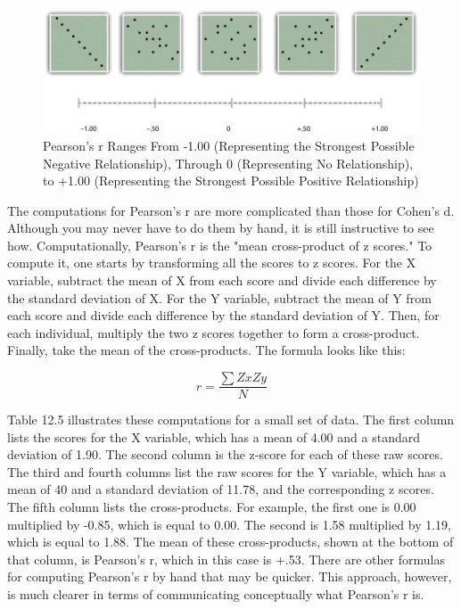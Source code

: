 \begin{figure}
\includegraphics[width=\linewidth]{figures/Fig12-9}
\caption{ Pearson's r Ranges From -1.00 (Representing the Strongest Possible Negative Relationship), Through 0 (Representing No Relationship), to +1.00 (Representing the Strongest Possible Positive Relationship)}
\label{fig:pearsons}
\end{figure}


The computations for Pearson's r are more complicated than those for Cohen's d. Although you may never have to do them by hand, it is still instructive to see how. Computationally, Pearson's r is the "mean cross-product of z scores." To compute it, one starts by transforming all the scores to z scores. For the X variable, subtract the mean of X from each score and divide each difference by the standard deviation of X. For the Y variable, subtract the mean of Y from each score and divide each difference by the standard deviation of Y. Then, for each individual, multiply the two z scores together to form a cross-product. Finally, take the mean of the cross-products. The formula looks like this:

\begin{equation}
r = \frac{\sum ZxZy}{N} 
\end{equation}

Table 12.5 illustrates these computations for a small set of data. The first column lists the scores for the X variable, which has a mean of 4.00 and a standard deviation of 1.90. The second column is the z-score for each of these raw scores. The third and fourth columns list the raw scores for the Y variable, which has a mean of 40 and a standard deviation of 11.78, and the corresponding z scores. The fifth column lists the cross-products. For example, the first one is 0.00 multiplied by -0.85, which is equal to 0.00. The second is 1.58 multiplied by 1.19, which is equal to 1.88. The mean of these cross-products, shown at the bottom of that column, is Pearson's r, which in this case is +.53. There are other formulas for computing Pearson's r by hand that may be quicker. This approach, however, is much clearer in terms of communicating conceptually what Pearson's r is.

